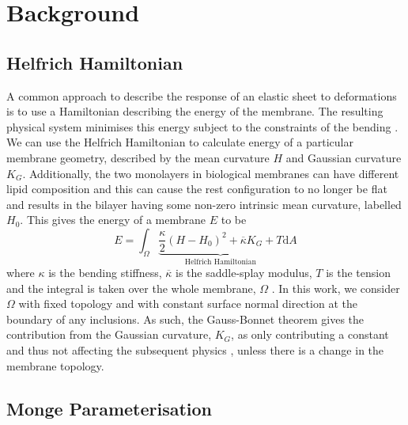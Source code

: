 \section{Background}

\subsection{Helfrich Hamiltonian}

A common approach to describe the response of an elastic sheet to deformations is to use a Hamiltonian describing the energy of the membrane. The resulting physical system minimises this energy subject to the constraints of the bending \cite{deserno_fluid_nodate}. We can use the Helfrich Hamiltonian to calculate energy of a particular membrane geometry, described by the mean curvature $H$ and Gaussian curvature $K_G$. Additionally, the two monolayers in biological membranes can have different lipid composition and this can cause the rest configuration to no longer be flat and results in the bilayer having some non-zero intrinsic mean curvature, labelled $H_0$. This gives the energy of a membrane $E$ to be
\begin{equation}
    E = \int_{\Omega}\underbrace{\frac{\kappa}{2}(H-H_0)^2 + \overline{\kappa}K_G + T}_{\text{Helfrich Hamiltonian}}\text{d}A
    \label{helfrich}
\end{equation}
where $\kappa$ is the bending stiffness, $\overline{\kappa}$ is the saddle-splay modulus, $T$ is the tension and the integral is taken over the whole membrane, $\Omega$ \cite{kwiecinski_interactions_2020}. In this work, we consider $\Omega$ with fixed topology and with constant surface normal direction at the boundary of any inclusions. As such, the Gauss-Bonnet theorem gives the contribution from the Gaussian curvature, $K_G$, as only contributing a constant and thus not affecting the subsequent physics \cite{deserno_fluid_nodate}, unless there is a change in the membrane topology.

\subsection{Monge Parameterisation}

